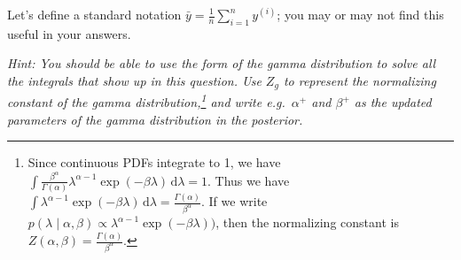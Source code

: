 \documentclass{article}
\newcommand{\hint}[1]{\textcolor{black!60!white}{\emph{Hint: #1}}}
\newcommand{\ud}{\,\mathrm{d}}
\newcommand{\toth}[1]{^{(#1)}}
\newcommand{\ith}{\toth{i}}
\begin{document}
Let's define a standard notation $\bar{y} = \frac1n \sum_{i=1}^n y\ith$;
you may or may not find this useful in your answers.

\hint{You should be able to use the form of the gamma distribution to solve all the integrals that show up in this question. Use $Z_g$ to represent the normalizing constant of the gamma distribution,\footnote{%
    Since continuous PDFs integrate to 1, we have 
    $\int \frac{\beta^\alpha}{\Gamma(\alpha)} \lambda^{\alpha-1} \exp(-\beta\lambda) \ud\lambda = 1$. 
    Thus we have $\int \lambda^{\alpha-1} \exp(-\beta\lambda) \ud\lambda = \frac{\Gamma(\alpha)}{\beta^\alpha}$.
    If we write $p(\lambda \mid \alpha, \beta) \propto \lambda^{\alpha-1} \exp(-\beta\lambda))$,
    then the normalizing constant is $Z(\alpha,\beta) = \frac{\Gamma(\alpha)}{\beta^\alpha}$.
} and write e.g.\ $\alpha^+$ and $\beta^+$ as the updated parameters of the gamma distribution in the posterior.}
\end{document}
